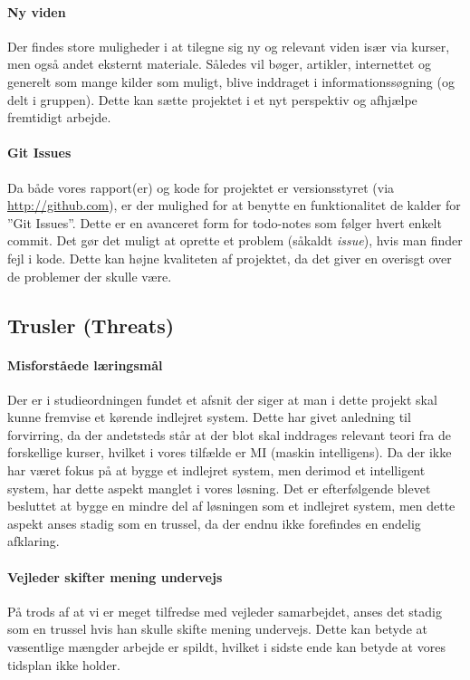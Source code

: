 \paragraph{Ny viden}\label{swot:ny_viden}
Der findes store muligheder i at tilegne sig ny og relevant viden især via kurser, men også andet eksternt materiale.
Således vil bøger, artikler, internettet og generelt som mange kilder som muligt, blive inddraget i informationssøgning (og delt i gruppen).
Dette kan sætte projektet i et nyt perspektiv og afhjælpe fremtidigt arbejde.

\paragraph{Git Issues}
Da både vores rapport(er) og kode for projektet er versionsstyret (via \url{http://github.com}), er der mulighed for at benytte en funktionalitet de kalder for ''Git Issues''.
Dette er en avanceret form for todo-notes som følger hvert enkelt commit.
Det gør det muligt at oprette et problem (såkaldt \textit{issue}), hvis man finder fejl i kode.
Dette kan højne kvaliteten af projektet, da det giver en overisgt over de problemer der skulle være.

\subsection{Trusler \textnormal{(\textbf{T}hreats)}}

\paragraph{Misforståede læringsmål}\label{swot:laeringsmaal}
Der er i studieordningen fundet et afsnit der siger at man i dette projekt skal kunne fremvise et kørende indlejret system.
Dette har givet anledning til forvirring, da der andetsteds står at der blot skal inddrages relevant teori fra de forskellige kurser, hvilket i vores tilfælde er MI (maskin intelligens).
Da der ikke har været fokus på at bygge et indlejret system, men derimod et intelligent system, har dette aspekt manglet i vores løsning.
Det er efterfølgende blevet besluttet at bygge en mindre del af løsningen som et indlejret system, men dette aspekt anses stadig som en trussel, da der endnu ikke forefindes en endelig afklaring.

\paragraph{Vejleder skifter mening undervejs}\label{swot:vejleder}
På trods af at vi er meget tilfredse med vejleder samarbejdet, anses det stadig som en trussel hvis han skulle skifte mening undervejs.
Dette kan betyde at væsentlige mængder arbejde er spildt, hvilket i sidste ende kan betyde at vores tidsplan ikke holder.
